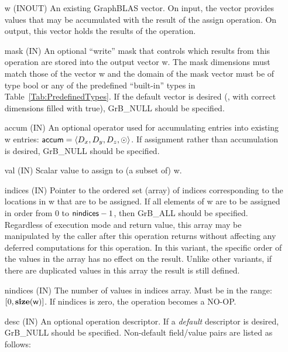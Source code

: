 \begin{itemize}[leftmargin=1.1in]
    \item[{\sf w}]    ({\sf INOUT}) An existing GraphBLAS vector.  On input,
    the vector provides values that may be accumulated with the result of the
    assign operation.  On output, this vector holds the results of the
    operation.

    \item[{\sf mask}] ({\sf IN}) An optional ``write'' mask that controls which
    results from this operation are stored into the output vector {\sf w}. The 
    mask dimensions must match those of the vector {\sf w} and the domain of the
    {\sf mask} vector must be of type {\sf bool} or any of the predefined 
    ``built-in'' types in Table~\ref{Tab:PredefinedTypes}.  If the default vector
    is desired (\ie, with correct dimensions filled with {\sf true}), 
    {\sf GrB\_NULL} should be specified.

    \item[{\sf accum}]    ({\sf IN}) An optional operator used for accumulating
    entries into existing {\sf w} entries: ${\sf accum} = \langle D_x,
    D_y, D_z,\odot \rangle$. If assignment rather than accumulation is
    desired, {\sf GrB\_NULL} should be specified.

    \item[{\sf val}]      ({\sf IN}) Scalar value to assign to (a subset of) {\sf w}.
    
    \item[{\sf indices}]  ({\sf IN}) Pointer to the ordered set (array) of 
    indices corresponding to the locations in {\sf w} that are to be assigned.  
    If all elements of {\sf w} are to be assigned in order from $0$ to 
    ${\sf nindices} - 1$, then {\sf GrB\_ALL} should be specified.  Regardless of 
    execution mode and return value, this array may be manipulated by the caller
    after this operation returns without affecting any deferred computations for 
    this operation.  In this variant, the specific order of the values in the
    array has no effect on the result.  Unlike other variants, if there are 
    duplicated values in this array the result is still defined.
    
    \item[{\sf nindices}] ({\sf IN}) The number of values in {\sf indices} array.
    Must be in the range: $[0, \bold{size}({\sf w})]$.  If {\sf nindices}
    is zero, the operation becomes a NO-OP.

    \item[{\sf desc}] ({\sf IN}) An optional operation descriptor. If
    a \emph{default} descriptor is desired, {\sf GrB\_NULL} should be
    specified. Non-default field/value pairs are listed as follows:  \\


\end{itemize}
